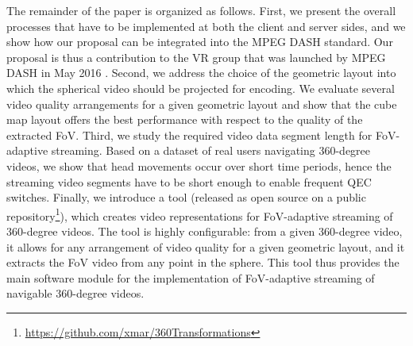 The remainder of the paper is organized as follows. First, we present the overall processes that have to
be implemented at both the client and server sides, and we show how our proposal can be integrated
into the MPEG \ac{DASH} standard. Our proposal is thus a contribution to the
\ac{VR} group that was launched by MPEG \ac{DASH} in May 2016 \cite{mpeg-vr}.
Second, we address the choice of the geometric layout into which the spherical video should
be projected for encoding. We evaluate
several video quality arrangements for a given geometric layout and show that the
cube map layout offers the best performance with respect to the quality of the extracted
\ac{FoV}.
Third, we study the required video data segment length
for \ac{FoV}-adaptive streaming. Based on a dataset of
real users navigating 360-degree videos, we show that head movements occur over short time periods, hence the streaming video segments have to be short enough to enable
frequent \ac{QEC} switches.
Finally, we introduce a tool (released as open source on a public
repository\footnote{\url{https://github.com/xmar/360Transformations}}),
which creates video representations for
\ac{FoV}-adaptive streaming of 360-degree videos.
The tool is highly configurable: from a given 360-degree video, it allows for
any arrangement of video quality for a given geometric layout, and it
extracts the
\ac{FoV} video from any point in the sphere. This tool thus provides the
main software module for the implementation of \ac{FoV}-adaptive streaming
of navigable 360-degree videos.


%
%
%
%


